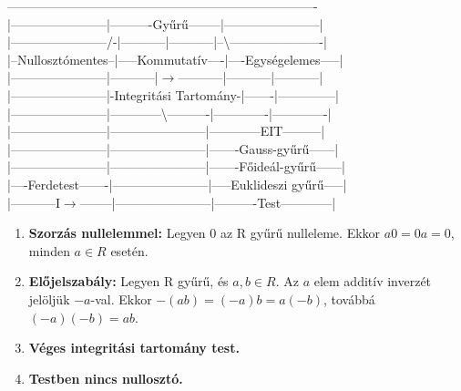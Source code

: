 \begin{frame}
\begin{tcolorbox}[title={Algebrai struktúrák kpacsolata (Kép)}]
-------------------------------------------------------------------------\\
|-----------------------|----------Gyűrű--------|-----------------------|\\
|-----------------------/-|-----------|-----------|--{\textbackslash}----------------------|\\
|--Nullosztómentes--|-----Kommutatív----|----Egységelemes-----|\\
|-----------------------|-----------|$\rightarrow$-----------|-----------|-----------|\\
|-----------------------|-Integritási Tartomány-|-------|--------------|\\
|-----------------------|------------{\textbackslash}----------|-------------|-------------|\\
|-----------------------|-----------------------|------------EIT---------|\\
|-----------------------|-----------------------|-------Gauss-gyűrű------|\\
|-----------------------|-----------------------|-------Főideál-gyűrű------|\\
|----Ferdetest-------|-----------------------|-----Euklideszi gyűrű-----|\\
|-----------I$\rightarrow$--------|-----------------------|----------Test------------|\\
\end{tcolorbox}
\end{frame}

\begin{frame}
  \begin{tcolorbox}[title={Lemma: Észrevételek gyűrűkben}]
    \begin{enumerate}
      \item \textbf{Szorzás nullelemmel:} Legyen 0 az R gyűrű nulleleme. Ekkor $a0 = 0a = 0$, minden $a \in R$ esetén.
      \item \textbf{Előjelszabály:} Legyen R gyűrű, és $a, b \in R$. Az $a$ elem additív inverzét jelöljük $-a$-val. Ekkor $-(ab) = (-a)b = a(-b)$, továbbá $(-a)(-b) = ab$.
      \item \textbf{Véges integritási tartomány test.}
      \item \textbf{Testben nincs nullosztó.}
    \end{enumerate}
  \end{tcolorbox}
\end{frame}

